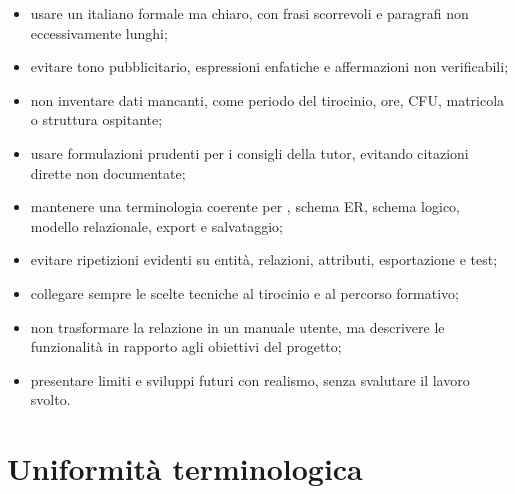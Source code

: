 \begin{itemize}
    \item usare un italiano formale ma chiaro, con frasi scorrevoli e paragrafi non eccessivamente lunghi;
    \item evitare tono pubblicitario, espressioni enfatiche e affermazioni non verificabili;
    \item non inventare dati mancanti, come periodo del tirocinio, ore, CFU, matricola o struttura ospitante;
    \item usare formulazioni prudenti per i consigli della tutor, evitando citazioni dirette non documentate;
    \item mantenere una terminologia coerente per \builder, schema ER, schema logico, modello relazionale, export e salvataggio;
    \item evitare ripetizioni evidenti su entità, relazioni, attributi, esportazione e test;
    \item collegare sempre le scelte tecniche al tirocinio e al percorso formativo;
    \item non trasformare la relazione in un manuale utente, ma descrivere le funzionalità in rapporto agli obiettivi del progetto;
    \item presentare limiti e sviluppi futuri con realismo, senza svalutare il lavoro svolto.
\end{itemize}

\section{Uniformità terminologica}

